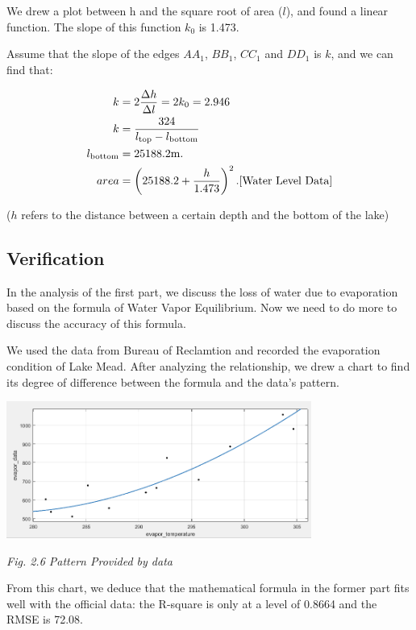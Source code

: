 \documentclass[12pt]{article}
\theoremstyle{definition}
\theoremstyle{remark}
\numberwithin{equation}{section}
\begin{document}
	We drew a plot between h and the square root of area ($l$), and found a linear function. The slope of this function $k_0$  is 1.473.
	
	Assume that the slope of the edges $AA_1$, $BB_1$, $CC_1$ and $DD_1$ is $k$, and we can find that:
	
	\begin{align*}
		k&=2\frac{\Delta h}{\Delta l}=2k_0=2.946\\
		k&=\frac{324}{l_\text{top}-l_\text{bottom}}\\
		l_{\text{bottom}}&=25188.2\rm{m}.\\
		area&=\left(25188.2+\frac{h}{1.473}\right)^2. \cite{Water Level Data}\\
	\end{align*}
	
	($h$ refers to the distance between a certain depth and the bottom of the lake)

	\subsection{Verification}
	In the analysis of the first part, we discuss the loss of water due to evaporation based on the formula of Water Vapor Equilibrium. Now we need to do more to discuss the accuracy of this formula.
	
	We used the data from Bureau of Reclamtion \cite{Storage Data} and recorded the evaporation condition of Lake Mead. After analyzing the relationship, we drew a chart to find its degree of difference between the formula and the data's pattern.
	
	\begin{center}
		\includegraphics[width=10cm]{2.6 Pattern provided by data.png}
		
		\small \textit{Fig. 2.6 Pattern Provided by data}
	\end{center}

	From this chart, we deduce that the mathematical formula in the former part fits well with the official data: the R-square is only at a level of 0.8664 and the RMSE is 72.08.
\end{document}
